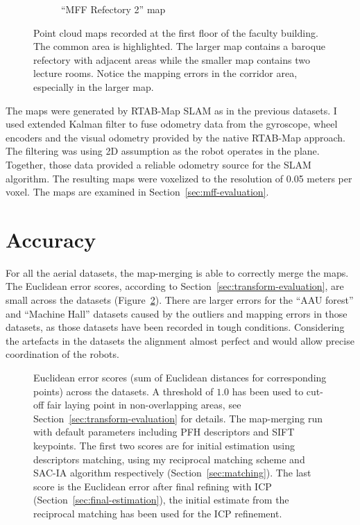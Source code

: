 \begin{figure}
\begin{subfigure}[b]{\textwidth}
        \caption{``MFF Refectory 2'' map}
    \end{subfigure}
    \caption[MFF Refectory maps]{Point cloud maps recorded at the first floor of the faculty building. The common area is highlighted. The larger map contains a baroque refectory with adjacent areas while the smaller map contains two lecture rooms. Notice the mapping errors in the corridor area, especially in the larger map.}
    \label{fig:mff_refectory}
\end{figure}


The maps were generated by RTAB-Map \gls{SLAM} as in the previous datasets. I used extended Kalman filter to fuse odometry data from the gyroscope, wheel encoders and the visual odometry provided by the native RTAB-Map approach. The filtering was using \gls{2D} assumption as the robot operates in the plane. Together, those data provided a reliable odometry source for the \gls{SLAM} algorithm. The resulting maps were voxelized to the resolution of 0.05 meters per voxel. The maps are examined in Section~\ref{sec:mff-evaluation}.

\section{Accuracy}

For all the aerial datasets, the map-merging is able to correctly merge the maps. The Euclidean error scores, according to Section~\ref{sec:transform-evaluation}, are small across the datasets (Figure~\ref{fig:plot:euc_dist}). There are larger errors for the ``AAU forest'' and ``Machine Hall'' datasets caused by the outliers and mapping errors in those datasets, as those datasets have been recorded in tough conditions. Considering the artefacts in the datasets the alignment almost perfect and would allow precise coordination of the robots.

\begin{figure}
  \centering
  
  \caption[Euclidean error scores for aerial datasets]{Euclidean error scores (sum of Euclidean distances for corresponding points) across the datasets. A threshold of $1.0$ has been used to cut-off fair laying point in non-overlapping areas, see Section~\ref{sec:transform-evaluation} for details. The map-merging run with default parameters including \gls{PFH} descriptors and \gls{SIFT} keypoints. The first two scores are for initial estimation using descriptors matching, using my reciprocal matching scheme and \gls{SAC-IA} algorithm respectively (Section~\ref{sec:matching}). The last score is the Euclidean error after final refining with \gls{ICP} (Section~\ref{sec:final-estimation}), the initial estimate from the reciprocal matching has been used for the \gls{ICP} refinement.}
  \label{fig:plot:euc_dist}
\end{figure}

